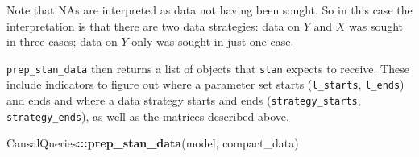 \documentclass[
  12pt,
]{book}
\newenvironment{Shaded}{\begin{snugshade}}{\end{snugshade}}
\newcommand{\KeywordTok}[1]{\textcolor[rgb]{0.13,0.29,0.53}{\textbf{#1}}}
\newcommand{\NormalTok}[1]{#1}
\newcommand{\OperatorTok}[1]{\textcolor[rgb]{0.81,0.36,0.00}{\textbf{#1}}}
\begin{document}
Note that NAs are interpreted as data not having been sought. So in this case the interpretation is that there are two data strategies: data on \(Y\) and \(X\) was sought in three cases; data on \(Y\) only was sought in just one case.

\texttt{prep\_stan\_data} then returns a list of objects that \texttt{stan} expects to receive. These include indicators to figure out where a parameter set starts (\texttt{l\_starts}, \texttt{l\_ends}) and ends and where a data strategy starts and ends (\texttt{strategy\_starts}, \texttt{strategy\_ends}), as well as the matrices described above.

\begin{Shaded}
\begin{Highlighting}[]
\NormalTok{CausalQueries}\OperatorTok{:::}\KeywordTok{prep_stan_data}\NormalTok{(model, compact_data)}
\end{Highlighting}
\end{Shaded}
\end{document}
